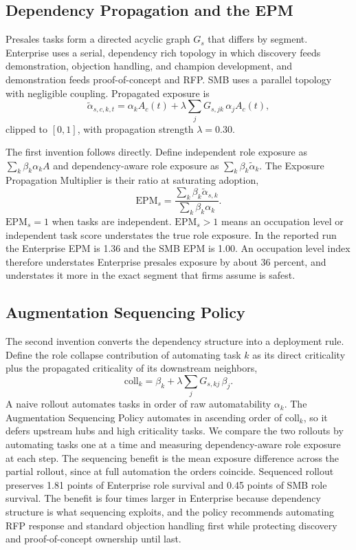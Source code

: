 \documentclass[10pt,conference]{IEEEtran}
\begin{document}
\subsection{Dependency Propagation and the EPM}
Presales tasks form a directed acyclic graph $G_s$ that differs by segment. Enterprise uses a serial, dependency rich topology in which discovery feeds demonstration, objection handling, and champion development, and demonstration feeds proof-of-concept and RFP. SMB uses a parallel topology with negligible coupling. Propagated exposure is
\begin{equation}
\tilde{\alpha}_{s,c,k,t} = \alpha_{k} A_c(t) + \lambda \sum_j G_{s,jk}\,\alpha_{j} A_c(t),
\end{equation}
clipped to $[0,1]$, with propagation strength $\lambda = 0.30$.

The first invention follows directly. Define independent role exposure as $\sum_k \beta_k \alpha_k A$ and dependency-aware role exposure as $\sum_k \beta_k \tilde{\alpha}_k$. The Exposure Propagation Multiplier is their ratio at saturating adoption,
\begin{equation}
\mathrm{EPM}_s = \frac{\sum_k \beta_k \tilde{\alpha}_{s,k}}{\sum_k \beta_k \alpha_k}.
\end{equation}
$\mathrm{EPM}_s = 1$ when tasks are independent. $\mathrm{EPM}_s > 1$ means an occupation level or independent task score understates the true role exposure. In the reported run the Enterprise EPM is 1.36 and the SMB EPM is 1.00. An occupation level index therefore understates Enterprise presales exposure by about 36 percent, and understates it more in the exact segment that firms assume is safest.

\subsection{Augmentation Sequencing Policy}
The second invention converts the dependency structure into a deployment rule. Define the role collapse contribution of automating task $k$ as its direct criticality plus the propagated criticality of its downstream neighbors,
\begin{equation}
\mathrm{coll}_k = \beta_k + \lambda \sum_j G_{s,kj}\,\beta_j.
\end{equation}
A naive rollout automates tasks in order of raw automatability $\alpha_k$. The Augmentation Sequencing Policy automates in ascending order of $\mathrm{coll}_k$, so it defers upstream hubs and high criticality tasks. We compare the two rollouts by automating tasks one at a time and measuring dependency-aware role exposure at each step. The sequencing benefit is the mean exposure difference across the partial rollout, since at full automation the orders coincide. Sequenced rollout preserves 1.81 points of Enterprise role survival and 0.45 points of SMB role survival. The benefit is four times larger in Enterprise because dependency structure is what sequencing exploits, and the policy recommends automating RFP response and standard objection handling first while protecting discovery and proof-of-concept ownership until last.
\end{document}
